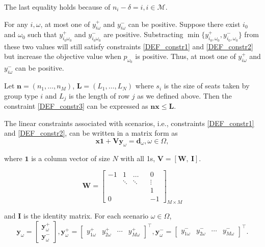 
The last equality holds because of $n_i- \delta = i, i \in \mathcal{M}$. 

\begin{remark}
For any $i, \omega$, at most one of $y_{i \omega}^{+}$ and $y_{i \omega}^{-}$ can be positive. 
Suppose there exist $i_0$ and $\omega_0$ such that $y_{i_0 \omega_0}^{+}$ and $y_{i_0 \omega_0}^{-}$ are positive. Substracting $\min\{y_{i_0, \omega_0}^{+}, y_{i_0, \omega_0}^{-}\}$ from these two values will still satisfy constraints \eqref{DEF_constr1} and \eqref{DEF_constr2} but increase the objective value when $p_{\omega_0}$ is positive. Thus, at most one of $y_{i \omega}^{+}$ and $y_{i \omega}^{-}$ can be positive. 
\end{remark}

Let $\mathbf{n} = (n_1, \ldots, n_M)$, $\mathbf{L} = (L_1, \ldots, L_N)$ where $s_i$ is the size of seats taken by group type $i$ and $L_j$ is the length of row $j$ as we defined above. Then the constraint \eqref{DEF_constr3} can be expressed as $\mathbf{n} \mathbf{x} \leq \mathbf{L}$.

The linear constraints associated with scenarios, i.e., constraints \eqref{DEF_constr1} and \eqref{DEF_constr2}, can be written in a matrix form as
\[\mathbf{x} \mathbf{1} + \mathbf{V} \mathbf{y}_\omega = \mathbf{d}_\omega, \omega\in \Omega,\]

where $\mathbf{1}$ is a column vector of size $N$ with all 1s, $\mathbf{V} = [\mathbf{W}, ~\mathbf{I}]$.

$$
\mathbf{W}=\left[\begin{array}{ccccc}
-1 & 1 & \ldots & & 0 \\
& \ddots & \ddots & & \vdots \\
& & & & 1 \\
0 & & & & -1
\end{array}\right]_{M \times M}
$$

and $\mathbf{I}$ is the identity matrix. For each scenario $\omega \in \Omega$,
$$
\mathbf{y}_{\omega}=\left[\begin{array}{l}
\mathbf{y}_{\omega}^{+} \\
\mathbf{y}_{\omega}^{-}
\end{array}\right], \mathbf{y}_{\omega}^{+}=\left[\begin{array}{lllll}y_{1 \omega}^{+} & y_{2 \omega}^{+} & \cdots & y_{M \omega}^{+}\end{array}\right]^{\intercal}, \mathbf{y}_{\omega}^{-}=\left[\begin{array}{llll}y_{1 \omega}^{-} & y_{2 \omega}^{-} & \cdots & y_{M \omega}^{-}\end{array}\right]^{\intercal}.
$$

